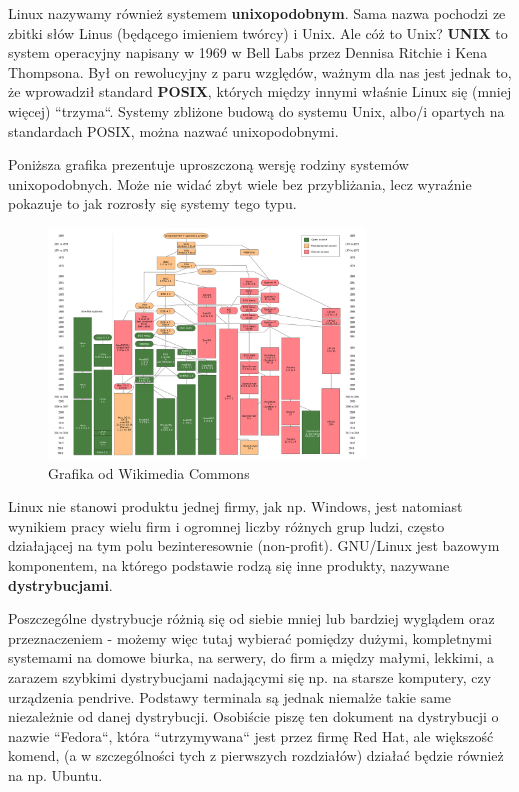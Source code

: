 \documentclass[12pt]{article}
\begin{document}
Linux nazywamy również systemem \textbf{unixopodobnym}. Sama nazwa pochodzi ze zbitki słów Linus (będącego imieniem twórcy) i Unix. Ale cóż to Unix? \textbf{UNIX} to system operacyjny napisany w 1969 w Bell Labs przez Dennisa Ritchie i Kena Thompsona. Był on rewolucyjny z paru względów, ważnym dla nas jest jednak to, że wprowadził standard \textbf{POSIX}, których między innymi właśnie Linux się (mniej więcej) ``trzyma``. Systemy zbliżone budową do systemu Unix, albo/i opartych na standardach POSIX, można nazwać unixopodobnymi.

Poniższa grafika prezentuje uproszczoną wersję rodziny systemów unixopodobnych. Może nie widać zbyt wiele bez przybliżania, lecz wyraźnie pokazuje to jak rozrosły się systemy tego typu.

\begin{figure}[H]
    \centering
    \includegraphics[width=0.75\textwidth]{Unix_history-simple.svg.png}
    \caption{Grafika od Wikimedia Commons}
\end{figure}

Linux nie stanowi produktu jednej firmy, jak np. Windows, jest natomiast wynikiem pracy wielu firm i ogromnej liczby różnych grup ludzi, często działającej na tym polu bezinteresownie (non-profit). GNU/Linux jest bazowym komponentem, na którego podstawie rodzą się inne produkty, nazywane \textbf{dystrybucjami}.

Poszczególne dystrybucje różnią się od siebie mniej lub bardziej wyglądem oraz przeznaczeniem - możemy więc tutaj wybierać pomiędzy dużymi, kompletnymi systemami na domowe biurka, na serwery, do firm a między małymi, lekkimi, a zarazem szybkimi dystrybucjami nadającymi się np. na starsze komputery, czy urządzenia pendrive. Podstawy terminala są jednak niemalże takie same niezależnie od danej dystrybucji. Osobiście piszę ten dokument na dystrybucji o nazwie ``Fedora``, która ``utrzymywana`` jest przez firmę Red Hat, ale większość komend, (a w szczególności tych z pierwszych rozdziałów) działać będzie również na np. Ubuntu.
\end{document}
